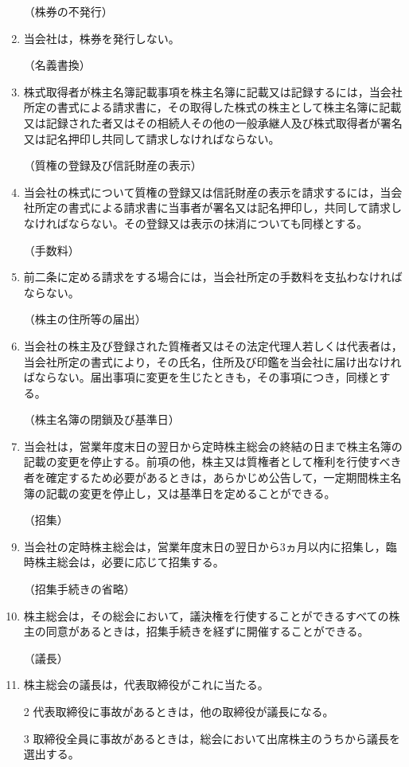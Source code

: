 \documentclass[11pt,a4paper,uplatex]{jsarticle}
\makeatletter
\def\section{\@startsection{section}{1}{-40pt}{15pt}{10pt}{\normalfont\Large\bfseries\centering}}
\newcommand{\header}[1]{\vspace{5pt}\hspace{-42pt}（{#1}）}
\makeatother
\begin{document}
\begin{enumerate}
\header{株券の不発行}
\item 当会社は，株券を発行しない。

\header{名義書換}
\item 株式取得者が株主名簿記載事項を株主名簿に記載又は記録するには，当会社所定の書式による請求書に，その取得した株式の株主として株主名簿に記載又は記録された者又はその相続人その他の一般承継人及び株式取得者が署名又は記名押印し共同して請求しなければならない。

\header{質権の登録及び信託財産の表示}
\item 当会社の株式について質権の登録又は信託財産の表示を請求するには，当会社所定の書式による請求書に当事者が署名又は記名押印し，共同して請求しなければならない。その登録又は表示の抹消についても同様とする。

\header{手数料}
\item 前二条に定める請求をする場合には，当会社所定の手数料を支払わなければならない。

\header{株主の住所等の届出}
\item 当会社の株主及び登録された質権者又はその法定代理人若しくは代表者は，当会社所定の書式により，その氏名，住所及び印鑑を当会社に届け出なければならない。届出事項に変更を生じたときも，その事項につき，同様とする。

\header{株主名簿の閉鎖及び基準日}
\item 当会社は，営業年度末日の翌日から定時株主総会の終結の日まで株主名簿の記載の変更を停止する。前項の他，株主又は質権者として権利を行使すべき者を確定するため必要があるときは，あらかじめ公告して，一定期間株主名簿の記載の変更を停止し，又は基準日を定めることができる。


\section{株主総会}


\item[]
\header{招集}
\item 当会社の定時株主総会は，営業年度末日の翌日から3ヵ月以内に招集し，臨時株主総会は，必要に応じて招集する。

\header{招集手続きの省略}
\item 株主総会は，その総会において，議決権を行使することができるすべての株主の同意があるときは，招集手続きを経ずに開催することができる。

\header{議長}
\item 株主総会の議長は，代表取締役がこれに当たる。
\item[2] 代表取締役に事故があるときは，他の取締役が議長になる。
\item[3] 取締役全員に事故があるときは，総会において出席株主のうちから議長を選出する。


\end{enumerate}
\end{document}
